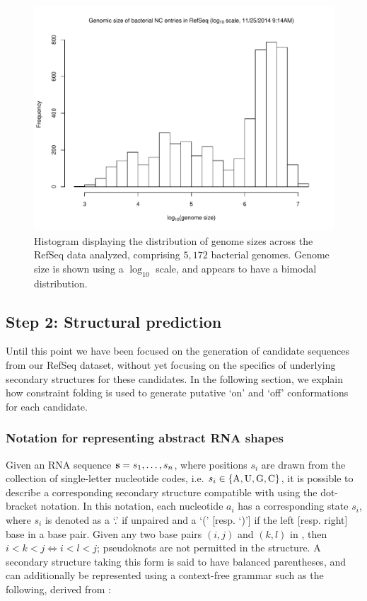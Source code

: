 \begin{figure}[!ht]
\centering
\includegraphics[width=.9\textwidth]{Figures/Ribofinder/refseqGenomeSizes.pdf}
\caption[Histogram displaying the distribution of genome sizes across RefSeq]{Histogram displaying the distribution of genome sizes across the RefSeq
data analyzed, comprising $5,172$ bacterial genomes. Genome size is shown using a
$\log_{10}$ scale, and appears to have a bimodal distribution.}
\label{fig:rfinder:genomeSizes}
\end{figure}

\subsection{Step 2: Structural prediction}
\label{subsec:rfinder:strpred}

Until this point we have been focused on the generation of candidate sequences
from our RefSeq dataset, without yet focusing on the specifics of underlying
secondary structures for these candidates. In the following section, we explain
how constraint folding is used to generate putative `on' and `off' conformations
for each candidate.

\subsubsection{Notation for representing abstract RNA shapes}
\label{subsubsec:rfinder:shapes}

Given an RNA sequence ${\bf s} = s_1,\dots,s_n$, where positions $s_i$ are drawn from the
collection of single-letter nucleotide codes, i.e.
$s_i \in \{\text{A,\,U,\,G,\,C}\}$, it is possible to describe a corresponding
secondary structure \strS compatible with \seq using the dot-bracket notation.
In this notation, each nucleotide $a_i$ has a corresponding state $s_i$, where
$s_i$ is denoted as a `.' if unpaired and a `(' [resp. `)'] if the left [resp.
right] base in a base pair. Given any two base pairs $(i,j)$ and $(k,l)$ in \strS,
then $i < k < j \iff i < l < j$; pseudoknots are not permitted in the structure. A
secondary structure taking this form is said to have balanced parentheses, and can
additionally be represented using a context-free grammar such as the
following, derived from \citep{fusy:2012ka}:

